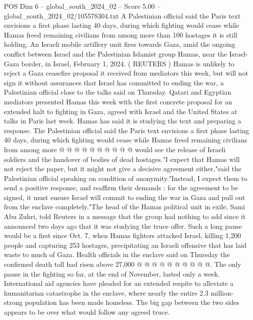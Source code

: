 \begin{textsample}{POS Dim 6 – global\_south\_2024\_02 – Score 5.00 – global\_south\_2024\_02/105578304.txt}  \label{ex:f6_pos_182}
A Palestinian official said the Paris text envisions a first phase lasting 40 days, during which fighting would cease while Hamas freed remaining civilians from among more than 100 hostages it is still holding.
An Israeli mobile artillery unit fires towards Gaza, amid the ongoing conflict between Israel and the Palestinian Islamist group Hamas, near the Israel-Gaza border, in Israel, February 1, 2024. ( REUTERS ) Hamas is unlikely to reject a Gaza ceasefire proposal it received from mediators this week, but will not sign it without assurances that Israel has committed to ending the war, a Palestinian official close to the talks said on Thursday.
Qatari and Egyptian mediators presented Hamas this week with the first concrete proposal for an extended halt to fighting in Gaza, agreed with Israel and the United States at talks in Paris last week.
Hamas has said it is studying the text and preparing a response.
The Palestinian official said the Paris text envisions a first phase lasting 40 days, during which fighting would cease while Hamas freed remaining civilians from among more @ @ @ @ @ @ @ @ @ @ would see the release of Israeli soldiers and the handover of bodies of dead hostages."I expect that Hamas will not reject the paper, but it might not give a decisive agreement either,"said the Palestinian official speaking on condition of anonymity."Instead, I expect them to send a positive response, and reaffirm their demands : for the agreement to be signed, it must ensure Israel will commit to ending the war in Gaza and pull out from the enclave completely."The head of the Hamas political unit in exile, Sami Abu Zuhri, told Reuters in a message that the group had nothing to add since it announced two days ago that it was studying the truce offer.
Such a long pause would be a first since Oct. 7, when Hamas fighters attacked Israel, killing 1,200 people and capturing 253 hostages, precipitating an Israeli offensive that has laid waste to much of Gaza.
Health officials in the enclave said on Thursday the confirmed death toll had risen above 27,000 @ @ @ @ @ @ @ @ @ @.
The only pause in the fighting so far, at the end of November, lasted only a week.
International aid agencies have pleaded for an extended respite to alleviate a humanitarian catastrophe in the enclave, where nearly the entire 2.3 million-strong population has been made homeless.
The big gap between the two sides appears to be over what would follow any agreed truce.

\end{textsample}
